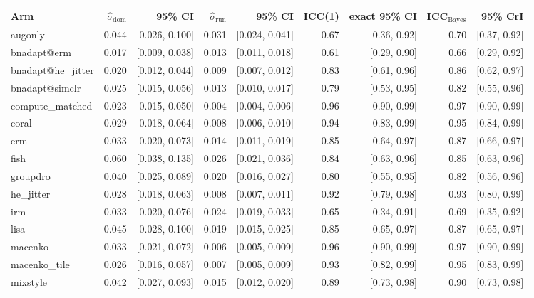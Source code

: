 \begin{tabular}{lrrrrrrrr}
\toprule
Arm & $\hat\sigma_\text{dom}$ & 95\% CI & $\hat\sigma_\text{run}$ & 95\% CI & ICC(1) & exact 95\% CI & ICC$_\text{Bayes}$ & 95\% CrI \\
\midrule
augonly & 0.044 & [0.026, 0.100] & 0.031 & [0.024, 0.041] & 0.67 & [0.36, 0.92] & 0.70 & [0.37, 0.92] \\
bnadapt@erm & 0.017 & [0.009, 0.038] & 0.013 & [0.011, 0.018] & 0.61 & [0.29, 0.90] & 0.66 & [0.29, 0.92] \\
bnadapt@he\_jitter & 0.020 & [0.012, 0.044] & 0.009 & [0.007, 0.012] & 0.83 & [0.61, 0.96] & 0.86 & [0.62, 0.97] \\
bnadapt@simclr & 0.025 & [0.015, 0.056] & 0.013 & [0.010, 0.017] & 0.79 & [0.53, 0.95] & 0.82 & [0.55, 0.96] \\
compute\_matched & 0.023 & [0.015, 0.050] & 0.004 & [0.004, 0.006] & 0.96 & [0.90, 0.99] & 0.97 & [0.90, 0.99] \\
coral & 0.029 & [0.018, 0.064] & 0.008 & [0.006, 0.010] & 0.94 & [0.83, 0.99] & 0.95 & [0.84, 0.99] \\
erm & 0.033 & [0.020, 0.073] & 0.014 & [0.011, 0.019] & 0.85 & [0.64, 0.97] & 0.87 & [0.66, 0.97] \\
fish & 0.060 & [0.038, 0.135] & 0.026 & [0.021, 0.036] & 0.84 & [0.63, 0.96] & 0.85 & [0.63, 0.96] \\
groupdro & 0.040 & [0.025, 0.089] & 0.020 & [0.016, 0.027] & 0.80 & [0.55, 0.95] & 0.82 & [0.56, 0.96] \\
he\_jitter & 0.028 & [0.018, 0.063] & 0.008 & [0.007, 0.011] & 0.92 & [0.79, 0.98] & 0.93 & [0.80, 0.99] \\
irm & 0.033 & [0.020, 0.076] & 0.024 & [0.019, 0.033] & 0.65 & [0.34, 0.91] & 0.69 & [0.35, 0.92] \\
lisa & 0.045 & [0.028, 0.100] & 0.019 & [0.015, 0.025] & 0.85 & [0.65, 0.97] & 0.87 & [0.65, 0.97] \\
macenko & 0.033 & [0.021, 0.072] & 0.006 & [0.005, 0.009] & 0.96 & [0.90, 0.99] & 0.97 & [0.90, 0.99] \\
macenko\_tile & 0.026 & [0.016, 0.057] & 0.007 & [0.005, 0.009] & 0.93 & [0.82, 0.99] & 0.95 & [0.83, 0.99] \\
mixstyle & 0.042 & [0.027, 0.093] & 0.015 & [0.012, 0.020] & 0.89 & [0.73, 0.98] & 0.90 & [0.73, 0.98] \\

\end{tabular}
